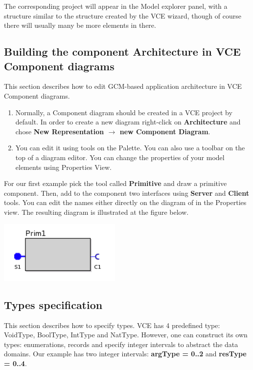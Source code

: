 \documentclass[12pt]{article}
\begin{document}
The corresponding project will appear in the Model explorer panel, with a structure similar to the structure created by the VCE wizard, though of course there will usually many be more elements in there.

\subsection{Building the component Architecture in VCE Component diagrams}\label{sec:comp-diagr}
This section describes how to edit GCM-based application architecture in VCE Component diagrams.
\begin{enumerate}
\item
Normally, a Component diagram should be created in a VCE project by default. In order to create a new diagram right-click on \textbf{Architecture} and chose \textbf{New Representation $\rightarrow$ new Component Diagram}.
\item
You can edit it using tools on the Palette. You can also use a toolbar on the top of a diagram editor. You can change the properties of your model elements using Properties View.
\end{enumerate}

For our first example pick the tool called \textbf{Primitive} and draw a primitive component. Then, add to the component two interfaces using \textbf{Server} and \textbf{Client} tools. You can edit the names either directly on the diagram of in the Properties view. The resulting diagram is illustrated at the figure below.

     \centerline{
     \includegraphics[width=6cm]{draws/prim.png}
     \label{fig:vce-proj}
     }
\subsection{Types specification}
This section describes how to specify types. VCE has 4 predefined type: VoidType, BoolType, IntType and NatType. However, one can construct its own types: enumerations, records and specify integer intervals to abstract the data domains. Our example has two integer intervals: \textbf{argType = 0..2} and \textbf{resType = 0..4}.
\end{document}
